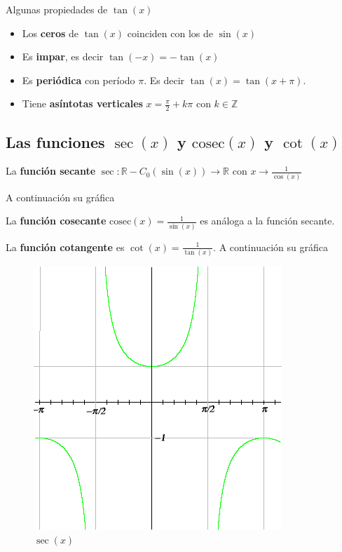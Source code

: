 \begin{property}
Algunas propiedades de $\tan(x)$

\begin{itemize}
\item Los \textbf{ceros} de $\tan(x)$ coinciden con los de $\sin(x)$
	
\item Es \textbf{impar}, es decir $\tan(-x) = -\tan(x)$
	
\item Es \textbf{periódica} con período $\pi$.  Es decir $\tan(x) = \tan(x+\pi)$.
	
\item Tiene \textbf{asíntotas verticales} $x = \frac{\pi}{2} + k \pi$ con $k \in \mathbb{Z}$
\end{itemize}
\end{property}

\subsection{Las funciones $\sec(x)$ y $\mathrm{cosec}(x)$ y $\cot(x)$}

\begin{definition} 
La \textbf{función secante}  $\sec : \mathbb{R} - C_0(\sin(x)) \to \mathbb{R}$ con $x \to \frac{1}{\cos(x)} $ 

A continuación su gráfica

La \textbf{función cosecante}  $\mathrm{cosec}(x) = \frac{1}{\sin(x)}$ es análoga a la función secante.

La \textbf{función cotangente}  es $\cot(x) = \frac{1}{\tan(x)}$.  A continuación su gráfica
\end{definition}

\begin{figure}[h]
\centering\includegraphics[scale=0.5]{images/01_precalculo/sec.png}
\caption{$\sec(x)$}
\end{figure}

